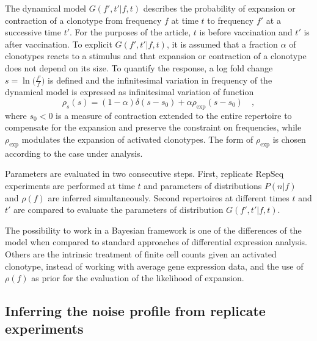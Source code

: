 \documentclass[a4paper,twocolumn]{article}
\begin{document}
The dynamical model $G(f', t'|f, t)$ describes the probability of expansion or contraction of a clonotype from frequency $f$ at time $t$ to frequency $f'$ at a successive time $t'$. For the purposes of the article, $t$ is before vaccination and $t'$ is after vaccination. To explicit $G(f', t'|f, t)$, it is assumed that a fraction $\alpha$ of clonotypes reacts to a stimulus and that expansion or contraction of a clonotype does not depend on its size. To quantify the response, a log fold change $s = \ln \big( \frac{f'}{f} \big)$ is defined and the infinitesimal variation in frequency of the dynamical model is expressed as infinitesimal variation of function
\[
  \rho_s(s) = (1 - \alpha) \delta(s - s_0) + \alpha \rho_\mathrm{exp} (s - s_0) \quad ,
\]
where $s_0 < 0$ is a measure of contraction extended to the entire repertoire to compensate for the expansion and preserve the constraint on frequencies, while $\rho_\mathrm{exp}$ modulates the expansion of activated clonotypes. The form of $\rho_\mathrm{exp}$ is chosen according to the case under analysis.

Parameters are evaluated in two consecutive steps. First, replicate RepSeq experiments are performed at time $t$ and parameters of distributions $P(n|f)$ and $\rho(f)$ are inferred simultaneously. Second repertoires at different times $t$ and $t'$ are compared to evaluate the parameters of distribution $G(f', t'|f, t)$.

The possibility to work in a Bayesian framework is one of the differences of the model when compared to standard approaches of differential expression analysis. Others are the intrinsic treatment of finite cell counts given an activated clonotype, instead of working with average gene expression data, and the use %
of $\rho(f)$ as prior for the evaluation of the likelihood of expansion.

\subsection{Inferring the noise profile from replicate experiments}


\end{document}
